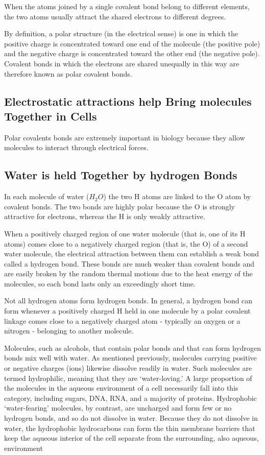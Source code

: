 When the atoms joined by a single covalent bond belong to different elements,
the two atoms usually attract the shared electrons to different degrees.

By definition, a polar structure (in the electrical sense) is one in which the
positive charge is concentrated toward
one end of the molecule (the positive pole) and the negative charge is
concentrated toward the other end (the negative pole). Covalent bonds
in which the electrons are shared unequally in this way are therefore
known as polar covalent bonds.

\subsection{Electrostatic attractions help Bring molecules Together in Cells}

Polar covalents bonds are extremely important in biology because they allow
molecules to interact through electrical forces.

\subsection{Water is held Together by hydrogen Bonds}

In each molecule of water ($H_{2}O$) the two H atoms are linked to the O
atom by covalent bonds. The two bonds are highly polar because the O is
strongly attractive for electrons, whereas the H is only weakly attractive.

When a positively charged
region of one water molecule (that is, one of its H atoms) comes close to
a negatively charged region (that is, the O) of a second water molecule,
the electrical attraction between them can establish a weak bond called a
hydrogen bond. These bonds are much weaker than covalent bonds and
are easily broken by the random thermal motions due to the heat energy
of the molecules, so each bond lasts only an exceedingly short time.

Not all hydrogen atoms form hydrogen bonds. In general, a hydrogen
bond can form whenever a positively charged H held in one molecule by
a polar covalent linkage comes close to a negatively charged atom - typically
an oxygen or a nitrogen - belonging to another molecule.

Molecules, such as alcohols, that contain polar bonds and that can form
hydrogen bonds mix well with water. As mentioned previously, molecules
carrying positive or negative charges (ions) likewise dissolve
readily in water. Such molecules are termed hydrophilic, meaning that
they are ‘water-loving.’ A large proportion of the molecules in the aqueous
environment of a cell necessarily fall into this category, including
sugars, DNA, RNA, and a majority of proteins. Hydrophobic ‘water-fearing’
molecules, by contrast, are uncharged and form few or no hydrogen
bonds, and so do not dissolve in water.
Because
they do not dissolve in water, the hydrophobic hydrocarbons can form
the thin membrane barriers that keep the aqueous interior of the cell
separate from the surrounding, also aqueous, environment

